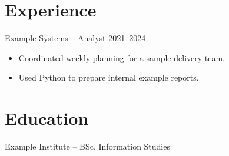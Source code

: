 \section{Experience}
Example Systems -- Analyst \hfill 2021--2024
\begin{itemize}
  \item Coordinated weekly planning for a sample delivery team.
  \item Used Python to prepare internal example reports.
\end{itemize}

\section{Education}
Example Institute -- BSc, Information Studies
